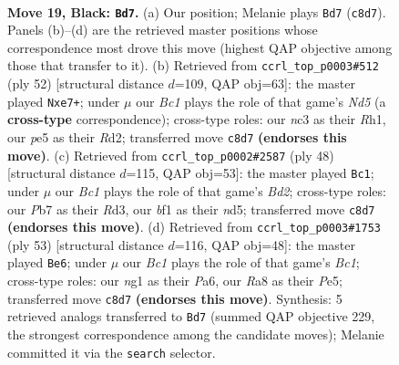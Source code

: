 \documentclass[11pt]{article}
\begin{document}
\begin{figure}[p]
\label{fig:thought-m35}
\end{figure}

\clearpage

\begin{figure}[p]\centering
\begin{subfigure}{0.46\textwidth}\centering
\resizebox{\linewidth}{!}{%
\newchessgame
\chessboard[
  setfen={rnb3k1/pp6/1p2p1p1/3pP3/1P1P1rpR/1PN5/8/3QKBN1 b - - 1 19},
  showmover=false,
  pgfstyle=straightmove, color=movearrow, markmove={c8-d7}
]}
\caption{}
\end{subfigure}\hfill
\begin{subfigure}{0.46\textwidth}\centering
\resizebox{\linewidth}{!}{%
\newchessgame
\chessboard[
  setfen={2q3kb/4pn1p/3p2pP/3N2Bn/4P3/2P2P2/rP1R2P1/2K4R w - - 0 27},
  showmover=false,
  pgfstyle=straightmove, color=movearrow, markmove={d5-e7}
]}
\caption{}
\end{subfigure}
\\[4pt]
\begin{subfigure}{0.46\textwidth}\centering
\resizebox{\linewidth}{!}{%
\newchessgame
\chessboard[
  setfen={1r6/2pk1pp1/p1p5/R2n3p/3Pr3/P2R2P1/1P1B1P1P/5K2 w - - 6 25},
  showmover=false,
  pgfstyle=straightmove, color=movearrow, markmove={d2-c1}
]}
\caption{}
\end{subfigure}\hfill
\begin{subfigure}{0.46\textwidth}\centering
\resizebox{\linewidth}{!}{%
\newchessgame
\chessboard[
  setfen={1rb5/4k3/p5p1/1p2pp1p/P6P/1R6/1PP1BPP1/2K5 b - - 0 27},
  showmover=false,
  pgfstyle=straightmove, color=movearrow, markmove={c8-e6}
]}
\caption{}
\end{subfigure}
\caption{\textbf{Move 19, Black: \texttt{Bd7}.} (a) Our position; Melanie plays \texttt{Bd7} (\texttt{c8d7}). Panels (b)--(d) are the retrieved master positions whose correspondence most drove this move (highest QAP objective among those that transfer to it). (b) Retrieved from \texttt{ccrl\_top\_p0003\#512} (ply 52) [structural distance $d$=109, QAP obj=63]: the master played \texttt{Nxe7+}; under $\mu$ our \emph{Bc1} plays the role of that game's \emph{Nd5} (a \textbf{cross-type} correspondence); cross-type roles: our \emph{n}c3 as their \emph{R}h1, our \emph{p}e5 as their \emph{R}d2; transferred move \texttt{c8d7} \textbf{(endorses this move)}. (c) Retrieved from \texttt{ccrl\_top\_p0002\#2587} (ply 48) [structural distance $d$=115, QAP obj=53]: the master played \texttt{Bc1}; under $\mu$ our \emph{Bc1} plays the role of that game's \emph{Bd2}; cross-type roles: our \emph{P}b7 as their \emph{R}d3, our \emph{b}f1 as their \emph{n}d5; transferred move \texttt{c8d7} \textbf{(endorses this move)}. (d) Retrieved from \texttt{ccrl\_top\_p0003\#1753} (ply 53) [structural distance $d$=116, QAP obj=48]: the master played \texttt{Be6}; under $\mu$ our \emph{Bc1} plays the role of that game's \emph{Bc1}; cross-type roles: our \emph{n}g1 as their \emph{P}a6, our \emph{R}a8 as their \emph{P}e5; transferred move \texttt{c8d7} \textbf{(endorses this move)}. Synthesis: 5 retrieved analogs transferred to \texttt{Bd7} (summed QAP objective 229, the strongest correspondence among the candidate moves); Melanie committed it via the \texttt{search} selector.}

\end{figure}
\end{document}

